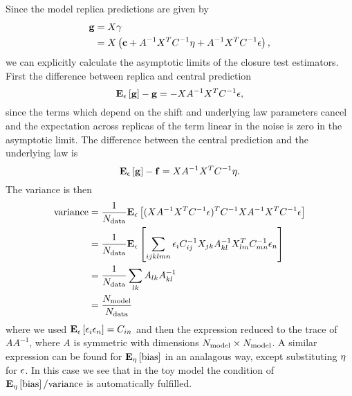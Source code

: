 Since the model replica predictions are given by
\begin{equation}
    \begin{split}
        \mathbf{g} &= X \mathbf{\gamma} \\
        &= X \left( \mathbf{c} + A^{-1} X^T C^{-1}_{} \mathbf{\eta} + A^{-1} X^T C^{-1}_{} \mathbf{\epsilon} \right),
    \end{split}
\end{equation}
we can explicitly calculate the asymptotic limits of the closure test estimators.
First the difference between replica and central prediction
\begin{equation}
    \mathbf{E}_{\epsilon}\left[ \mathbf{g} \right] - \mathbf{g} = - X A^{-1} X^T C^{-1}_{} \mathbf{\epsilon},
\end{equation}
since the terms which depend on the shift and underlying law parameters cancel
and the expectation across replicas of the term linear in the noise is zero
in the asymptotic limit. The difference between the central prediction and the
underlying law is
\begin{equation}
    \mathbf{E}_{\epsilon}\left[ \mathbf{g} \right] - \mathbf{f} = X A^{-1} X^T C^{-1}_{} \mathbf{\eta}.
\end{equation}
The variance is then
\begin{equation}\label{eq:polymodelvar}
    \begin{split}
        {\rm variance} &= \frac{1}{N_{\rm data}}\mathbf{E}_{\epsilon}\left[ (X A^{-1} X^T C^{-1}_{} \mathbf{\epsilon})^T C^{-1}_{} X A^{-1} X^T C^{-1}_{} \mathbf{\epsilon} \right] \\
        & = \frac{1}{N_{\rm data}}\mathbf{E}_{\epsilon}\left[ \sum_{ijklmn} \epsilon_i C^{-1}_{ij} X_{jk} A^{-1}_{kl} X^T_{lm} C^{-1}_{mn} \epsilon_{n} \right] \\
        & = \frac{1}{N_{\rm data}}\sum_{lk} A_{lk} A^{-1}_{kl} \\
        & = \frac{N_{\rm model}}{N_{\rm data}}
    \end{split}
\end{equation}
where we used $\mathbf{E}_{\epsilon}\left[ \epsilon_i \epsilon_{n} \right] = C_{in}$ and then the expression
reduced to the trace of $A A^{-1}$, where $A$ is symmetric with dimensions
$N_{\rm model} \times N_{\rm model}$. A similar expression can be found for $\mathbf{E}_{\eta}\left[ {\rm bias} \right]$
in an analagous way, except substituting $\eta$ for $\epsilon$. In this case
we see that in the toy model the condition of $\mathbf{E}_{\eta}\left[ {\rm bias} \right] / {\rm variance}$ is
automatically fulfilled.

